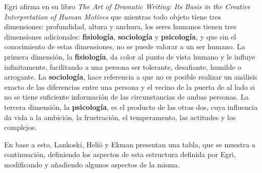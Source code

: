 Egri \autocite*{Egri1960} afirma en su libro \textit{The Art of Dramatic Writing: Its Basis in the Creative Interpretation 
of Human Motives} que mientras todo objeto tiene tres dimensiones: profundidad, altura y anchura, los seres humanos tienen 
tres dimensiones adicionales: \textbf{fisiología}, \textbf{sociología} y \textbf{psicología}, y que sin el conocimiento de estas dimensiones, no se puede
valorar a un ser humano. La primera dimensión, la \textbf{fisiología}, da color al punto de vista humano y le influye infinitamente, 
facilitando a una persona ser tolerante, desafiante, humilde o arrogante. La \textbf{sociología}, hace referencia a que no es posible 
realizar un análisis exacto de las diferencias entre una persona y el vecino de la puerta de al lado si no se tiene suficiente 
información de las circunstancias de ambas personas. La tercera dimensión, la \textbf{psicología}, es el producto de las otras dos, cuya 
influencia da vida a la ambición, la frustración, el temperamento, las actitudes y los complejos.\medskip

En base a esto, Lankoski, Heliö y Ekman \autocite*{Lankoski2003} presentan una tabla, que se muestra a continuación, definiendo los aspectos de esta 
estructura definida por Egri, modificando y añadiendo algunos aspectos de la misma.\medskip

